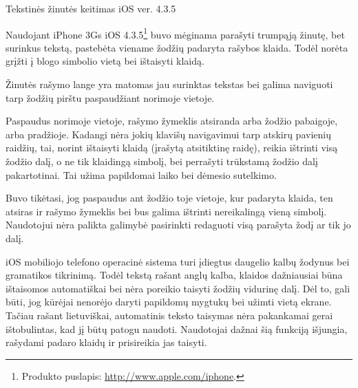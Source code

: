 \begin{xcase}{Tekstinės žinutės keitimas iOS ver. 4.3.5}
  \xcgoal
  {
  	Naudojant iPhone 3Gs 
	iOS 4.3.5\footnote{Produkto puslapis: \url{http://www.apple.com/iphone}.}
	buvo mėginama parašyti trumpąją žinutę, bet surinkus tekstą, pastebėta 
	viename žodžių padaryta rašybos klaida. Todėl norėta grįžti į blogo 
	simbolio vietą bei ištaisyti klaidą.
	
  }
  
  \xctools
  {
    Žinutės rašymo lange yra matomas jau surinktas tekstas bei galima 
    naviguoti tarp žodžių pirštu paspaudžiant norimoje vietoje. 
  }
  
  \xcresult
  {
    Paspaudus norimoje vietoje, rašymo žymeklis atsiranda arba žodžio
    pabaigoje, arba pradžioje. Kadangi nėra jokių klavišų navigavimui tarp
    atskirų pavienių raidžių, tai, norint ištaisyti klaidą 
    (įrašytą atsitiktinę raidę), reikia ištrinti visą žodžio dalį, o ne tik 
    klaidingą simbolį, bei perrašyti trūkstamą žodžio dalį pakartotinai. Tai 
    užima papildomai laiko bei dėmesio sutelkimo.
  }
  
  \xcprinciples
  {
    {
      Buvo tikėtasi, jog paspaudus ant žodžio toje vietoje, kur padaryta klaida,
      ten atsiras ir rašymo žymeklis bei bus galima ištrinti nereikalingą vieną
      simbolį.
    }
    {
      Naudotojui nėra palikta galimybė pasirinkti redaguoti visą
      parašyta žodį ar tik jo dalį.
    }
  }
  
  \xcthoughts
  {
    iOS mobiliojo telefono operacinė sistema turi įdiegtus daugelio
    kalbų žodynus bei gramatikos tikrinimą. Todėl tekstą rašant
    anglų kalba, klaidos dažniausiai būna ištaisomos automatiškai
    bei nėra poreikio taisyti žodžių vidurinę dalį. Dėl to, gali
    būti, jog kūrėjai nenorėjo daryti papildomų mygtukų bei
    užimti vietą ekrane. Tačiau rašant lietuviškai, automatinis
    teksto taisymas nėra pakankamai gerai ištobulintas, kad jį
    būtų patogu naudoti. Naudotojai dažnai šią funkciją išjungia,
    rašydami padaro klaidų ir prisireikia jas taisyti.
  }
\end{xcase}
